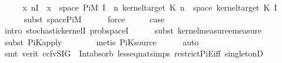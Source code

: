 \begin{isabellebody}
\ {}\isanewline
\ \ \isamarkupfalse%
\ {\isachardoublequoteopen}{\isacharparenleft}{\kern0pt}{\isasymlambda}x{\isachardot}{\kern0pt}\ {\isasymlambda}n{\isasymin}{\isacharbraceleft}{\kern0pt}I\ {}{\isacharbraceright}{\kern0pt}{\isachardot}{\kern0pt}\ x{\isacharparenright}{\kern0pt}\ {\isacharminus}{\kern0pt}{\isacharbackquote}{\kern0pt}\ space\ {\isacharparenleft}{\kern0pt}Pi\isactrlsub M\ {\isacharbraceleft}{\kern0pt}I\ {}{\isacharbraceright}{\kern0pt}\ {\isacharparenleft}{\kern0pt}{\isasymlambda}n{\isachardot}{\kern0pt}\ kernel{\isacharunderscore}{\kern0pt}target\ {\isacharparenleft}{\kern0pt}K\ n{\isacharparenright}{\kern0pt}{\isacharparenright}{\kern0pt}{\isacharparenright}{\kern0pt}\ {\isasymsubseteq}\ space\ {\isacharparenleft}{\kern0pt}kernel{\isacharunderscore}{\kern0pt}target\ {\isacharparenleft}{\kern0pt}K\ {\isacharparenleft}{\kern0pt}I\ {}{\isacharparenright}{\kern0pt}{\isacharparenright}{\kern0pt}{\isacharparenright}{\kern0pt}{\isachardoublequoteclose}\isanewline
\ \ \ \ \isamarkupfalse%
\ {\isacharparenleft}{\kern0pt}subst\ space{\isacharunderscore}{\kern0pt}PiM{\isacharparenright}{\kern0pt}\isanewline
\ \ \ \ \isamarkupfalse%
\ force\isanewline
\ \ \isamarkupfalse%
\ \isamarkupfalse%
\ {\isacharquery}{\kern0pt}case\isanewline
\ \ \ \ \isamarkupfalse%
\ {\isacharparenleft}{\kern0pt}intro\ stochastic{\isacharunderscore}{\kern0pt}kernelI\ prob{\isacharunderscore}{\kern0pt}spaceI{\isacharparenright}{\kern0pt}\isanewline
\ \ \ \ \isamarkupfalse%
\ {\isacharparenleft}{\kern0pt}subst\ kernel{\isacharunderscore}{\kern0pt}measure{\isacharunderscore}{\kern0pt}emeasure{\isacharparenright}{\kern0pt}\isanewline
\ \ \ \ \isamarkupfalse%
\ {\isacharparenleft}{\kern0pt}subst\ PiK{\isacharunderscore}{\kern0pt}apply{\isacharunderscore}{\kern0pt}{}{\isacharparenright}{\kern0pt}\isanewline
\ \ \ \ \ \ \isamarkupfalse%
\ {\isacharparenleft}{\kern0pt}metis\ PiK{\isacharunderscore}{\kern0pt}source{\isacharparenright}{\kern0pt}\isanewline
\ \ \ \ \isamarkupfalse%
\ auto\isanewline
\ \ \ \ \isamarkupfalse%
\ {\isacharparenleft}{\kern0pt}smt\ {\isacharparenleft}{\kern0pt}verit{\isacharcomma}{\kern0pt}\ ccfv{\isacharunderscore}{\kern0pt}SIG{\isacharparenright}{\kern0pt}\ {\isachardoublequoteopen}{}{\isachardoublequoteclose}\ Int{\isacharunderscore}{\kern0pt}absorb{}\ less{\isacharunderscore}{\kern0pt}eq{\isacharunderscore}{\kern0pt}nat{\isachardot}{\kern0pt}simps{\isacharparenleft}{\kern0pt}{}{\isacharparenright}{\kern0pt}\ restrict{\isacharunderscore}{\kern0pt}PiE{\isacharunderscore}{\kern0pt}iff\ singletonD\ \isanewline

\end{isabellebody}
